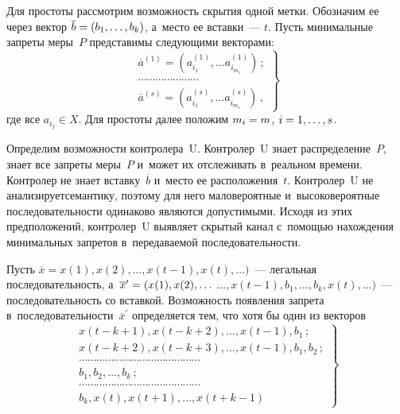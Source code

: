 \begin{multicols}{2}
  Для простоты рассмотрим возможность скрытия одной метки. Обозначим ее
через вектор $\overline{b}\hm= (b_1, \ldots , b_k)$, а~место ее вставки~--- $t$.
Пусть минимальные запреты меры~$P$ представимы следующими векторами:
  \begin{equation}
  \left.
  \begin{array}{l}
  \overline{a}^{(1)} = \left( a^{(1)}_{i_1},\ldots a^{(1)}_{i_{m_1}}\right)\,;\\
  \cdots\cdots\cdots\cdots\cdots\cdots\cdots\\
  \overline{a}^{(s)} = \left( a^{(s)}_{i_1},\ldots a^{(s)}_{i_{m_s}}\right)\,,
  \end{array}
  \right\}
  \label{e1-gr}
  \end{equation}
где все $a_{i_j}\in X$. Для простоты далее положим $m_i\hm=m$, $i\hm=
1,\ldots , s$.

  Определим возможности контролера~U. Контролер~U знает
распределение~$P$, знает все запреты меры~$P$ и~может их отслеживать
в~реальном вре\-мени. Контролер не знает вставку~$\overline{b}$ и~место ее\linebreak
расположения~$t$. Контролер~U не анализирует\linebreak семантику, поэтому для него
маловероятные и~высоковероятные последовательности одинаково являются
допустимыми. Исходя из этих предположений, контролер~U выявляет скрытый
канал с~по\-мощью нахождения минимальных запретов в~передаваемой
последовательности.

  Пусть $\overline{x}=x(1),x(2),\ldots, x(t-1),x(t),\ldots)$~--- легальная
последовательность, а~$\overline{x}^\prime\hm= (x(1),x(2),\ldots$\linebreak
$\ldots, x(t- 1),b_1,\ldots , b_k, x(t),\ldots)$~--- последовательность со вставкой. Возможность
по\-яв\-ле\-ния запрета в~последовательности~$\overline{x}^\prime$ определяется
тем, что хотя бы один из векторов
  \begin{equation}
  \left.
  \begin{array}{l}
  x(t-k+1), x(t-k+2),\ldots , x(t-1),b_1\,;\\[-1pt]
  x(t-k+2), x(t-k+3),\ldots , x(t-1),b_1, b_2\,;\\[-1pt]
\cdots\cdots\cdots\cdots\cdots\cdots\cdots\cdots\cdots\cdots\cdots\cdots\cdots\cdots\\[-1pt]
  b_1,b_2,\ldots , b_k\,;\\[-1pt]
\cdots\cdots\cdots\cdots\cdots\cdots\cdots\cdots\cdots\cdots\cdots\cdots\cdots\cdots\\[-1pt]
  b_k,x(t),x(t+1),\ldots , x(t+k-1)
  \end{array}
  \right\}\!
  \label{e2-gr}
  \end{equation}


\end{multicols}
